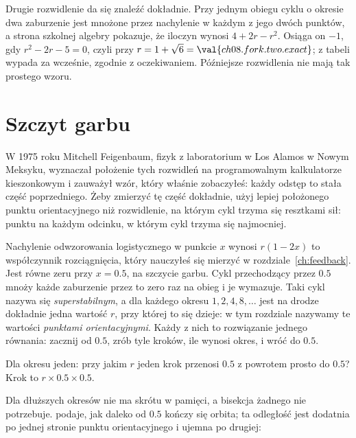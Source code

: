 \begin{note}
Drugie rozwidlenie da się znaleźć dokładnie. Przy jednym obiegu cyklu o
okresie dwa zaburzenie jest mnożone przez nachylenie w każdym z jego dwóch
punktów, a strona szkolnej algebry pokazuje, że iloczyn wynosi
$4 + 2r - r^{2}$. Osiąga on $-1$, gdy $r^{2} - 2r - 5 = 0$, czyli przy
$r = 1 + \sqrt{6} = \val{ch08.fork.two.exact}$;  z tabeli
wypada za wcześnie, zgodnie z oczekiwaniem. Późniejsze rozwidlenia nie mają
tak prostego wzoru.
\end{note}

\section{Szczyt garbu}
\label{sec:ch08-superstable}

\noindent
W 1975 roku Mitchell Feigenbaum, fizyk z laboratorium w Los Alamos w Nowym
Meksyku, wyznaczał położenie tych rozwidleń na programowalnym kalkulatorze
kieszonkowym i zauważył wzór, który właśnie zobaczyłeś: każdy odstęp to
stała część poprzedniego. Żeby zmierzyć tę część dokładnie, użyj lepiej
położonego punktu orientacyjnego niż rozwidlenie, na którym cykl trzyma się
resztkami sił: punktu na każdym odcinku, w którym cykl trzyma się
najmocniej.

Nachylenie odwzorowania logistycznego w punkcie $x$ wynosi $r(1 - 2x)$
\dash{} to współczynnik rozciągnięcia, który nauczyłeś się mierzyć w
rozdziale~\ref{ch:feedback}. Jest równe zeru przy $x = \num{0.5}$, na
szczycie garbu. Cykl przechodzący przez $\num{0.5}$ mnoży każde zaburzenie
przez to zero raz na obieg i je wymazuje. Taki cykl nazywa się
\emph{superstabilnym}, a dla każdego okresu $1, 2, 4, 8, \ldots$ jest na
drodze dokładnie jedna wartość $r$, przy której to się dzieje: w tym
rozdziale nazywamy te wartości \emph{punktami orientacyjnymi}. Każdy z nich
to rozwiązanie jednego równania: zacznij od $\num{0.5}$, zrób tyle kroków,
ile wynosi okres, i wróć do $\num{0.5}$.

\begin{think}
Dla okresu jeden: przy jakim $r$ jeden krok przenosi $\num{0.5}$ z powrotem
prosto do $\num{0.5}$? Krok to $r \times \num{0.5} \times \num{0.5}$.
\end{think}
Dla dłuższych okresów nie ma skrótu w pamięci, a bisekcja żadnego nie
potrzebuje.  podaje, jak daleko od $\num{0.5}$ kończy się
orbita; ta odległość jest dodatnia po jednej stronie punktu orientacyjnego i
ujemna po drugiej:

